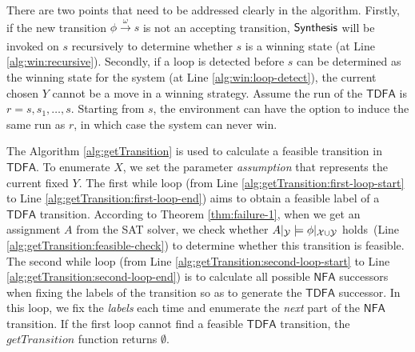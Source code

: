 \documentclass[letterpaper]{article} %
\newcommand{\tran}[1]{\xrightarrow[]{#1}}
\def\NFA{$\mathsf{NFA}$\xspace}
\def\tdfa{$\mathsf{TDFA}$\xspace}
\def\SAT{\textsf{SAT}\xspace}
\newcommand{\tool}{{\sf Synthesis}\xspace}
\begin{document}
There are two points that need to be addressed clearly in the algorithm. Firstly, if the new transition $\phi\tran{\omega}s$ is not an accepting transition, $\tool$ will be invoked on $s$ recursively to determine whether $s$ is a winning state (at Line \ref{alg:win:recursive}). Secondly, if a loop is detected before $s$ can be determined as the winning state for the system (at Line \ref{alg:win:loop-detect}), the current chosen $Y$ cannot be a move in a winning strategy.  Assume the run of the \tdfa is $r=s,s_1,\ldots, s$. Starting from $s$, the environment can have the option to induce the same run as $r$, in which case the system can never win.  



The Algorithm \ref{alg:getTransition} is used to calculate a feasible transition in \tdfa. To enumerate $X$, we set the parameter \emph{assumption} that represents the current fixed $Y$. The first while loop (from Line \ref{alg:getTransition:first-loop-start} to Line \ref{alg:getTransition:first-loop-end}) aims to obtain a feasible label of a \tdfa transition. According to Theorem \ref{thm:failure-1}, when we get an assignment $A$ from the \SAT solver, we check whether $A|_{\mathcal{Y}}\models \phi|_{\mathcal{X}\cup\mathcal{Y}}$ holds~(Line \ref{alg:getTransition:feasible-check}) to determine whether this transition is feasible. The second while loop (from Line \ref{alg:getTransition:second-loop-start} to Line \ref{alg:getTransition:second-loop-end}) is to calculate all possible \NFA successors when fixing the labels of the transition so as to generate the \tdfa successor. In this loop, we fix the \emph{labels} each time and enumerate the \emph{next} part of the \NFA transition. If the first loop cannot find a feasible \tdfa transition, the $getTransition$ function returns $\emptyset$. 
\end{document}
